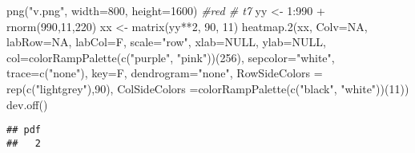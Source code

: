 \documentclass[
]{article}
\newenvironment{Shaded}{\begin{snugshade}}{\end{snugshade}}
\newcommand{\AttributeTok}[1]{\textcolor[rgb]{0.77,0.63,0.00}{#1}}
\newcommand{\CommentTok}[1]{\textcolor[rgb]{0.56,0.35,0.01}{\textit{#1}}}
\newcommand{\ConstantTok}[1]{\textcolor[rgb]{0.00,0.00,0.00}{#1}}
\newcommand{\DecValTok}[1]{\textcolor[rgb]{0.00,0.00,0.81}{#1}}
\newcommand{\FunctionTok}[1]{\textcolor[rgb]{0.00,0.00,0.00}{#1}}
\newcommand{\NormalTok}[1]{#1}
\newcommand{\OtherTok}[1]{\textcolor[rgb]{0.56,0.35,0.01}{#1}}
\newcommand{\SpecialCharTok}[1]{\textcolor[rgb]{0.00,0.00,0.00}{#1}}
\newcommand{\StringTok}[1]{\textcolor[rgb]{0.31,0.60,0.02}{#1}}
\begin{document}
\begin{Shaded}
\begin{Highlighting}[]
\FunctionTok{png}\NormalTok{(}\StringTok{"v.png"}\NormalTok{, }\AttributeTok{width=}\DecValTok{800}\NormalTok{, }\AttributeTok{height=}\DecValTok{1600}\NormalTok{) }\CommentTok{\#red \# t7}
\NormalTok{yy }\OtherTok{\textless{}{-}} \DecValTok{1}\SpecialCharTok{:}\DecValTok{990} \SpecialCharTok{+} \FunctionTok{rnorm}\NormalTok{(}\DecValTok{990}\NormalTok{,}\DecValTok{11}\NormalTok{,}\DecValTok{220}\NormalTok{)}
\NormalTok{xx }\OtherTok{\textless{}{-}} \FunctionTok{matrix}\NormalTok{(yy}\SpecialCharTok{**}\DecValTok{2}\NormalTok{, }\DecValTok{90}\NormalTok{, }\DecValTok{11}\NormalTok{)}
\FunctionTok{heatmap.2}\NormalTok{(xx, }\AttributeTok{Colv=}\ConstantTok{NA}\NormalTok{, }\AttributeTok{labRow=}\ConstantTok{NA}\NormalTok{, }\AttributeTok{labCol=}\NormalTok{F, }\AttributeTok{scale=}\StringTok{"row"}\NormalTok{, }\AttributeTok{xlab=}\ConstantTok{NULL}\NormalTok{,}
          \AttributeTok{ylab=}\ConstantTok{NULL}\NormalTok{, }\AttributeTok{col=}\FunctionTok{colorRampPalette}\NormalTok{(}\FunctionTok{c}\NormalTok{(}\StringTok{"purple"}\NormalTok{, }\StringTok{"pink"}\NormalTok{))(}\DecValTok{256}\NormalTok{),  }
        \AttributeTok{sepcolor=}\StringTok{"white"}\NormalTok{, }\AttributeTok{trace=}\FunctionTok{c}\NormalTok{(}\StringTok{"none"}\NormalTok{), }\AttributeTok{key=}\NormalTok{F, }\AttributeTok{dendrogram=}\StringTok{"none"}\NormalTok{,}
        \AttributeTok{RowSideColors =} \FunctionTok{rep}\NormalTok{(}\FunctionTok{c}\NormalTok{(}\StringTok{"lightgrey"}\NormalTok{),}\DecValTok{90}\NormalTok{),}
        \AttributeTok{ColSideColors =}\FunctionTok{colorRampPalette}\NormalTok{(}\FunctionTok{c}\NormalTok{(}\StringTok{"black"}\NormalTok{, }\StringTok{"white"}\NormalTok{))(}\DecValTok{11}\NormalTok{))}
\FunctionTok{dev.off}\NormalTok{()}
\end{Highlighting}
\end{Shaded}

\begin{verbatim}
## pdf 
##   2
\end{verbatim}
\end{document}
